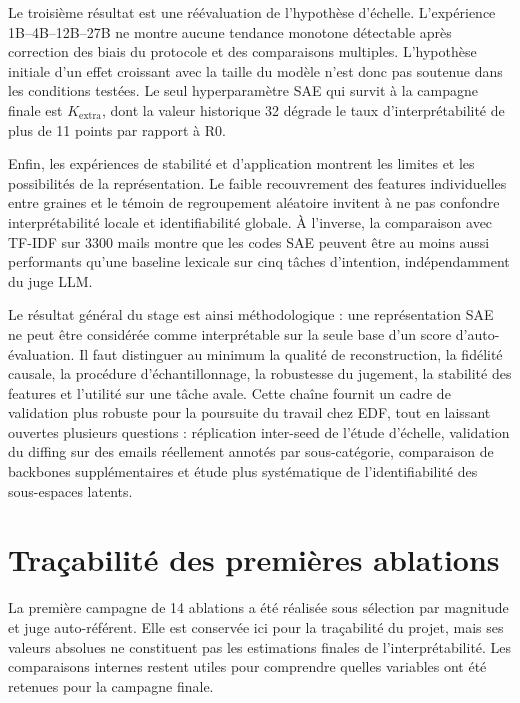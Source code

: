 \documentclass[11pt]{article}
\begin{document}
Le troisième résultat est une réévaluation de l'hypothèse d'échelle. L'expérience
1B--4B--12B--27B ne montre aucune tendance monotone détectable après correction des
biais du protocole et des comparaisons multiples. L'hypothèse initiale d'un effet
croissant avec la taille du modèle n'est donc pas soutenue dans les conditions testées.
Le seul hyperparamètre SAE qui survit à la campagne finale est $K_\text{extra}$, dont
la valeur historique 32 dégrade le taux d'interprétabilité de plus de 11 points par
rapport à R0.

Enfin, les expériences de stabilité et d'application montrent les limites et les
possibilités de la représentation. Le faible recouvrement des features individuelles
entre graines et le témoin de regroupement aléatoire invitent à ne pas confondre
interprétabilité locale et identifiabilité globale. À l'inverse, la comparaison avec
TF-IDF sur 3300 mails montre que les codes SAE peuvent être au moins aussi performants
qu'une baseline lexicale sur cinq tâches d'intention, indépendamment du juge LLM.

Le résultat général du stage est ainsi méthodologique : une représentation SAE ne peut
être considérée comme interprétable sur la seule base d'un score d'auto-évaluation.
Il faut distinguer au minimum la qualité de reconstruction, la fidélité causale,
la procédure d'échantillonnage, la robustesse du jugement, la stabilité des features
et l'utilité sur une tâche avale. Cette chaîne fournit un cadre de validation plus
robuste pour la poursuite du travail chez EDF, tout en laissant ouvertes plusieurs
questions : réplication inter-seed de l'étude d'échelle, validation du diffing sur des
emails réellement annotés par sous-catégorie, comparaison de backbones supplémentaires
et étude plus systématique de l'identifiabilité des sous-espaces latents.

\appendix
\section{Traçabilité des premières ablations}

La première campagne de 14 ablations a été réalisée sous sélection par magnitude et
juge auto-référent. Elle est conservée ici pour la traçabilité du projet, mais ses
valeurs absolues ne constituent pas les estimations finales de l'interprétabilité.
Les comparaisons internes restent utiles pour comprendre quelles variables ont été
retenues pour la campagne finale.
\end{document}
